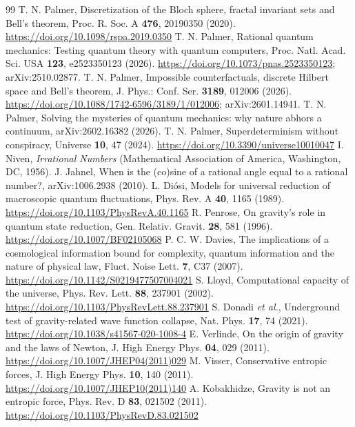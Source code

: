 \documentclass[aps,prd,twocolumn,superscriptaddress,nofootinbib,showkeys]{revtex4-2}
\begin{document}
\begin{thebibliography}{99}
 T. N. Palmer, Discretization of the Bloch sphere, fractal invariant sets and Bell's theorem, Proc. R. Soc. A \textbf{476}, 20190350 (2020). \url{https://doi.org/10.1098/rspa.2019.0350}
 T. N. Palmer, Rational quantum mechanics: Testing quantum theory with quantum computers, Proc. Natl. Acad. Sci. USA \textbf{123}, e2523350123 (2026). \url{https://doi.org/10.1073/pnas.2523350123}; arXiv:2510.02877.
 T. N. Palmer, Impossible counterfactuals, discrete Hilbert space and Bell's theorem, J. Phys.: Conf. Ser. \textbf{3189}, 012006 (2026). \url{https://doi.org/10.1088/1742-6596/3189/1/012006}; arXiv:2601.14941.
 T. N. Palmer, Solving the mysteries of quantum mechanics: why nature abhors a continuum, arXiv:2602.16382 (2026).
 T. N. Palmer, Superdeterminism without conspiracy, Universe \textbf{10}, 47 (2024). \url{https://doi.org/10.3390/universe10010047}
 I. Niven, \emph{Irrational Numbers} (Mathematical Association of America, Washington, DC, 1956).
 J. Jahnel, When is the (co)sine of a rational angle equal to a rational number?, arXiv:1006.2938 (2010).
 L. Di\'osi, Models for universal reduction of macroscopic quantum fluctuations, Phys. Rev. A \textbf{40}, 1165 (1989). \url{https://doi.org/10.1103/PhysRevA.40.1165}
 R. Penrose, On gravity's role in quantum state reduction, Gen. Relativ. Gravit. \textbf{28}, 581 (1996). \url{https://doi.org/10.1007/BF02105068}
 P. C. W. Davies, The implications of a cosmological information bound for complexity, quantum information and the nature of physical law, Fluct. Noise Lett. \textbf{7}, C37 (2007). \url{https://doi.org/10.1142/S0219477507004021}
 S. Lloyd, Computational capacity of the universe, Phys. Rev. Lett. \textbf{88}, 237901 (2002). \url{https://doi.org/10.1103/PhysRevLett.88.237901}
 S. Donadi \emph{et al.}, Underground test of gravity-related wave function collapse, Nat. Phys. \textbf{17}, 74 (2021). \url{https://doi.org/10.1038/s41567-020-1008-4}
 E. Verlinde, On the origin of gravity and the laws of Newton, J. High Energy Phys. \textbf{04}, 029 (2011). \url{https://doi.org/10.1007/JHEP04(2011)029}
 M. Visser, Conservative entropic forces, J. High Energy Phys. \textbf{10}, 140 (2011). \url{https://doi.org/10.1007/JHEP10(2011)140}
 A. Kobakhidze, Gravity is not an entropic force, Phys. Rev. D \textbf{83}, 021502 (2011). \url{https://doi.org/10.1103/PhysRevD.83.021502}

\end{thebibliography}
\end{document}
